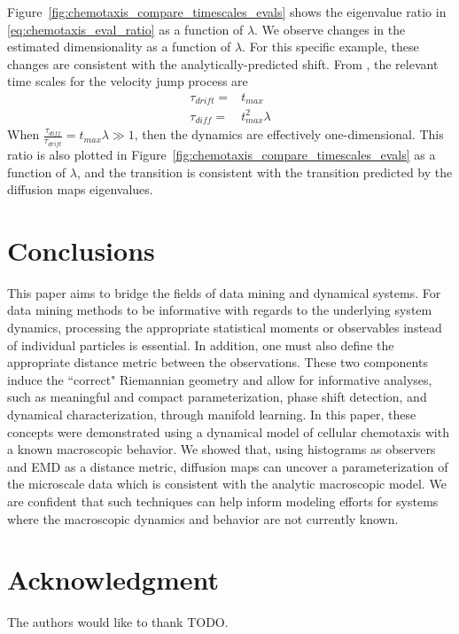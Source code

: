 \documentclass[preprint]{elsarticle}
\begin{document}
Figure~\ref{fig:chemotaxis_compare_timescales_evals} shows the eigenvalue ratio in \eqref{eq:chemotaxis_eval_ratio} as a function of $\lambda$. 
%
We observe changes in the estimated dimensionality as a function of $\lambda$.
%
%
%
For this specific example, these changes are consistent with the analytically-predicted shift. 
%
From \cite{othmer2000diffusion}, the relevant time scales for the velocity jump process are
%
\begin{equation}
\begin{aligned}
\tau_{drift} =& t_{max} \\
\tau_{diff} =& t_{max}^2 \lambda
\end{aligned}
\end{equation}
%
When $\frac{\tau_{diff}}{\tau_{drift}} =  t_{max}  \lambda \gg 1$, then the dynamics are effectively one-dimensional. 
%
This ratio is also plotted in Figure~\ref{fig:chemotaxis_compare_timescales_evals} as a function of $\lambda$, and the transition is consistent with the transition predicted by the diffusion maps eigenvalues. 


\section{Conclusions}

This paper aims to bridge the fields of data mining and dynamical systems. 
%
For data mining methods to be informative with regards to the underlying system dynamics, processing the appropriate statistical moments or observables instead of individual particles is essential. 
%
In addition, one must also define the appropriate distance metric between the observations.
%
These two components induce the ``correct" Riemannian geometry and allow for informative analyses, such as meaningful and compact parameterization, phase shift detection, and dynamical characterization, through manifold learning.
%
In this paper, these concepts were demonstrated using a dynamical model of cellular chemotaxis with a known macroscopic behavior.
%
We showed that, using histograms as observers and EMD as a distance metric, diffusion maps can uncover a parameterization of the microscale data which is consistent with the analytic macroscopic model.
%
We are confident that such techniques can help inform modeling efforts for systems where the macroscopic dynamics and behavior are not currently known. 


\section*{Acknowledgment}
The authors would like to thank TODO.



\end{document}
